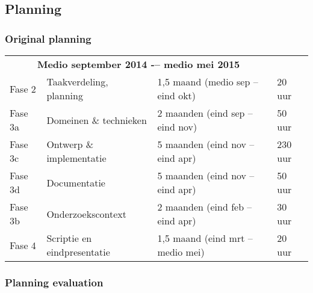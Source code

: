 
\subsection{Planning}
\subsubsection{Original planning}
\begin{tabular}{ l l l l }
  \multicolumn{3}{c}{\textbf{Medio september 2014 -– medio mei 2015}} & \\
Fase 2 & Taakverdeling, planning & 1,5 maand (medio sep -- eind okt)          & 20 uur \\
Fase 3a & Domeinen \& technieken & 2 maanden (eind sep -- eind nov)       & 50 uur \\
Fase 3c & Ontwerp \& implementatie & 5 maanden (eind nov -- eind apr)                & 230 uur \\
Fase 3d & Documentatie & 5 maanden (eind nov -- eind apr)                & 50 uur \\
Fase 3b & Onderzoekscontext & 2 maanden (eind feb -- eind apr)                   & 30 uur \\
Fase 4  & Scriptie en eindpresentatie & 1,5 maand (eind mrt -- medio mei)                      & 20 uur
\end{tabular}

\subsubsection{Planning evaluation}
\lipsum[1]
